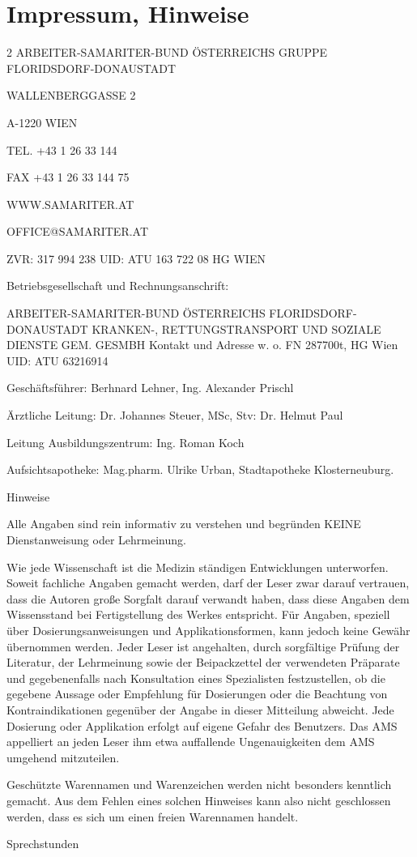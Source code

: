 \documentclass{article}
\begin{document}
\section{Impressum, Hinweise}
\begin{multicols}{2}
ARBEITER-SAMARITER-BUND \"OSTERREICHS GRUPPE FLORIDSDORF-DONAUSTADT

WALLENBERGGASSE 2

A-1220 WIEN

TEL. +43 1 26 33 144

FAX  +43 1 26 33 144 75

WWW.SAMARITER.AT

OFFICE@SAMARITER.AT

ZVR: 317 994 238  UID: ATU 163 722 08  HG WIEN

Betriebsgesellschaft und Rechnungsanschrift:

ARBEITER-SAMARITER-BUND \"OSTERREICHS FLORIDSDORF-DONAUSTADT KRANKEN-,
RETTUNGSTRANSPORT UND SOZIALE DIENSTE GEM. GESMBH Kontakt und Adresse
w. o. FN 287700t, HG Wien UID: ATU 63216914

Gesch\"aftsf\"uhrer: Berhnard Lehner, Ing. Alexander Prischl

\"Arztliche Leitung: Dr. Johannes Steuer, MSc,  Stv: Dr. Helmut Paul

Leitung Ausbildungszentrum: Ing. Roman Koch

Aufsichtsapotheke: Mag.pharm. Ulrike Urban, Stadtapotheke
Klosterneuburg. 

Hinweise

Alle Angaben sind rein informativ zu ver\-stehen und begr\"unden KEINE
Dienst\-an\-wei\-sung oder Lehr\-meinung. 

Wie jede Wissenschaft ist die Medizin st\"andigen Ent\-wicklungen
unterworfen. Soweit fachliche Angaben ge\-macht werden, darf der Leser
zwar darauf ver\-trau\-en, dass die Autoren gro{\ss}e Sorg\-falt
da\-rauf verwandt haben, dass diese An\-ga\-ben dem Wissens\-stand bei
Ferti\-gstel\-lung des Werkes entspricht. F\"ur Angaben, spe\-ziell
\"uber Dosierungsanweisungen und Ap\-plikations\-formen, kann jedoch
keine Ge\-w\"ahr \"ubernommen werden. Jeder Leser ist angehalten, durch
sorg\-f\"altige Pr\"u\-fung der Literatur, der Lehrmeinung so\-wie der
Beipackzettel der ver\-wendeten Pr\"aparate und gegebenenfalls nach
Konsultation eines Spezialisten fest\-zustellen, ob die gegebene
Aussage oder Empfehlung f\"ur Do\-sierungen oder die Beachtung von
Kon\-tra\-indi\-ka\-tionen gegen\"uber der Angabe in dieser
Mit\-tei\-lung abweicht. Jede Dosierung oder Ap\-pli\-kation erfolgt
auf eigene Gefahr des Be\-nutzers. Das AMS appelliert an jeden Le\-ser
ihm etwa auffallende Un\-ge\-nau\-igkei\-ten dem AMS umgehend
mitzuteilen.

Gesch\"utzte Waren\-namen und Wa\-ren\-zei\-chen werden nicht besonders
kenntlich ge\-macht. Aus dem Fehlen eines solchen Hin\-weises kann also
nicht ge\-schlossen werden, dass es sich um einen freien Waren\-namen
handelt.

\end{multicols}
Sprechstunden
\end{document}
